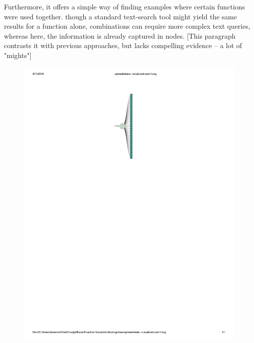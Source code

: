 \documentclass[conference]{IEEEtran}
\begin{document}
	Furthermore, it offers a simple way of finding examples where certain functions
	were used together. though a standard text-search tool might yield the same
	results for a function alone, combinations can require more complex text
	queries, whereas here, the information is already captured in nodes. [This
	paragraph contrasts it with previous approaches, but lacks compelling evidence
	-- a lot of "mights"] \par
	
	\begin{figure} \centering \includegraphics{SUM}
		\label{"fig:sum"} \end{figure}
	
\end{document}
